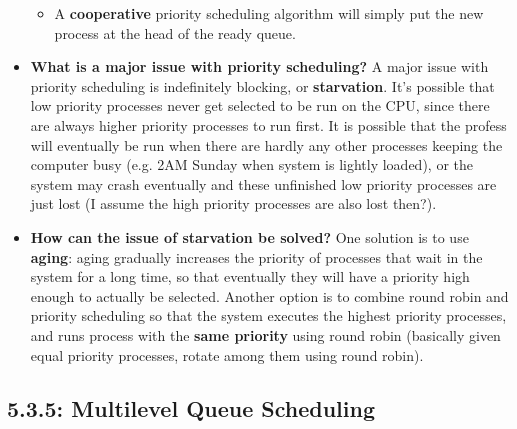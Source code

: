 \documentclass[12pt]{article}
\begin{document}
\begin{itemize}
\begin{itemize}
            \item A \textbf{cooperative} priority scheduling algorithm will simply put the new process at the head of the ready queue.
        \end{itemize}
    \item \textbf{What is a major issue with priority scheduling?} A major issue with priority scheduling is indefinitely blocking, or \textbf{starvation}. It's possible that low priority processes never get selected to be run on the CPU, since there are always higher priority processes to run first. It is possible that the profess will eventually be run when there are hardly any other processes keeping the computer busy (e.g. 2AM Sunday when system is lightly loaded), or the system may crash eventually and these unfinished low priority processes are just lost (I assume the high priority processes are also lost then?).
    \item \textbf{How can the issue of starvation be solved?} One solution is to use \textbf{aging}: aging gradually increases the priority of processes that wait in the system for a long time, so that eventually they will have a priority high enough to actually be selected. Another option is to combine round robin and priority scheduling so that the system executes the highest priority processes, and runs process with the \textbf{same priority} using round robin (basically given equal priority processes, rotate among them using round robin).
\end{itemize}

\subsection*{5.3.5: Multilevel Queue Scheduling}
\end{document}
